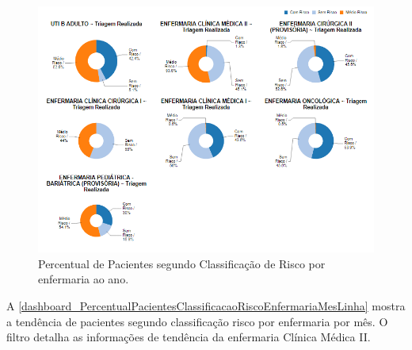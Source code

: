 \begin{figure}[htb]
	\caption{\label{dashboard_PercentualPacientesClassificacaoRiscoEnfermariaAnoPizza}Percentual de Pacientes segundo Classificação de Risco por enfermaria ao ano.}
	\begin{center}
	    \includegraphics[scale=0.6]{Imagens/2.3.PercentualPacientesClassificacaoRiscoEnfermariaAnoPizza.png}
	\end{center}
\end{figure}

\clearpage
A \autoref{dashboard_PercentualPacientesClassificacaoRiscoEnfermariaMesLinha} mostra a tendência de pacientes segundo classificação risco por enfermaria por mês. O filtro detalha as informações de tendência da enfermaria Clínica Médica II.

